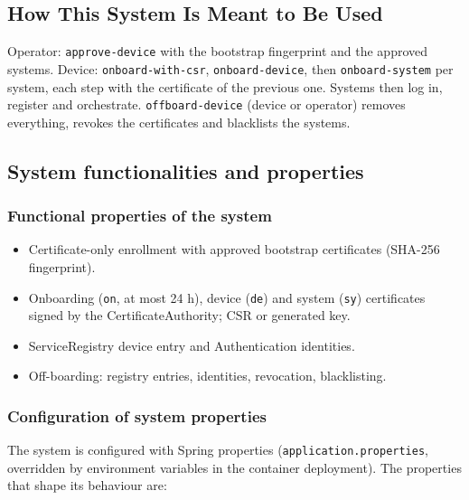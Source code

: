 \documentclass[a4paper]{arrowhead}
\begin{document}
\subsection{How This System Is Meant to Be Used}
\label{sec:use}

Operator: \texttt{approve-\allowbreak{}device} with the bootstrap fingerprint and the approved systems. Device: \texttt{onboard-\allowbreak{}with-\allowbreak{}csr}, \texttt{onboard-\allowbreak{}device}, then \texttt{onboard-\allowbreak{}system} per system, each step with the certificate of the previous one. Systems then log in, register and orchestrate. \texttt{offboard-\allowbreak{}device} (device or operator) removes everything, revokes the certificates and blacklists the systems.

\subsection{System functionalities and properties}
\label{sec:properties}

\subsubsection{Functional properties of the system}

\begin{itemize}
  \item Certificate-only enrollment with approved bootstrap certificates (SHA-256 fingerprint).
  \item Onboarding (\texttt{on}, at most 24 h), device (\texttt{de}) and system (\texttt{sy}) certificates signed by the Certificate\allowbreak{}Authority; CSR or generated key.
  \item ServiceRegistry device entry and Authentication identities.
  \item Off-boarding: registry entries, identities, revocation, blacklisting.
\end{itemize}

\subsubsection{Configuration of system properties}

The system is configured with Spring properties (\texttt{application.properties}, overridden by environment variables in the container deployment). The properties that shape its behaviour are:
\end{document}
